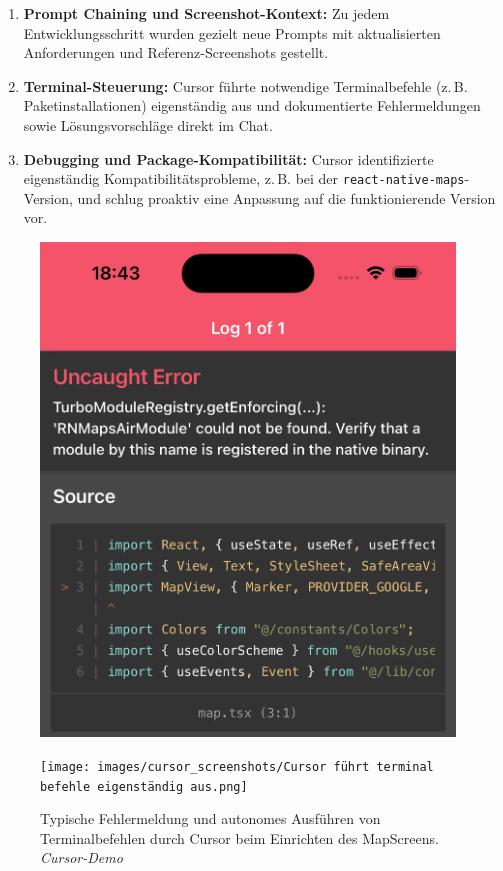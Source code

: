 \begin{enumerate}
      \item \textbf{Prompt Chaining und Screenshot-Kontext:} Zu jedem Entwicklungsschritt wurden gezielt neue Prompts mit aktualisierten Anforderungen und Referenz-Screenshots gestellt.
      \item \textbf{Terminal-Steuerung:} Cursor führte notwendige Terminalbefehle (z.\,B. Paketinstallationen) eigenständig aus und dokumentierte Fehlermeldungen sowie Lösungsvorschläge direkt im Chat.
      \item \textbf{Debugging und Package-Kompatibilität:} Cursor identifizierte eigenständig Kompatibilitätsprobleme, z.\,B. bei der \texttt{react-native-maps}-Version, und schlug proaktiv eine Anpassung auf die funktionierende Version vor.
\end{enumerate}

\begin{figure}[htbp]
      \centering
      \vspace{1em}
      \begin{minipage}{0.48\textwidth}
            \centering
            \includegraphics[width=0.98\textwidth]{images/cursor_screenshots/(NOBRIDGE) ERROR-cursor.png}
      \end{minipage}
      \hfill
      \begin{minipage}{0.48\textwidth}
            \centering
            \texttt{[image: images/cursor\_screenshots/Cursor führt terminal befehle eigenständig aus.png]}
      \end{minipage}
      \caption{Typische Fehlermeldung und autonomes Ausführen von Terminalbefehlen durch Cursor beim Einrichten des MapScreens. \textit{Cursor-Demo}}
      \label{fig:cursor-error-terminal}
\end{figure}

